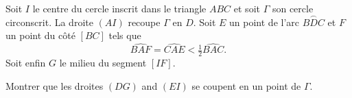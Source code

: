 Soit $I$ le centre du cercle inscrit dans le triangle $ABC$ et soit $\Gamma$ son cercle circonscrit. La droite
$(AI)$ recoupe $\Gamma$ en $D$. Soit $E$ un point de l'arc $\overset{\frown}{BDC}$ et $F$ un point du côté
$[BC]$ tels que
\[
\widehat{BAF} = \widehat{CAE} < \tfrac{1}{2}\widehat{BAC}.
\]
Soit enfin $G$ le milieu du segment $[IF]$.

Montrer que les droites $(DG)$ and $(EI)$ se coupent en un point de $\Gamma$.
